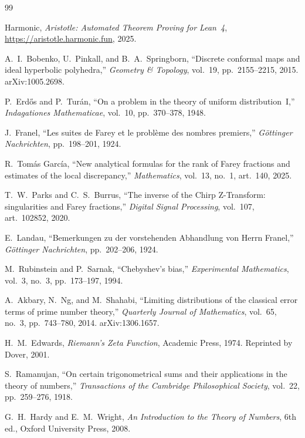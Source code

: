 \documentclass[11pt]{article}
\theoremstyle{definition}
\begin{document}
\begin{thebibliography}{99}

Harmonic,
\emph{Aristotle: Automated Theorem Proving for Lean~4},
\url{https://aristotle.harmonic.fun}, 2025.

A.~I.~Bobenko, U.~Pinkall, and B.~A.~Springborn,
``Discrete conformal maps and ideal hyperbolic polyhedra,''
\emph{Geometry \& Topology}, vol.~19, pp.~2155--2215, 2015.
arXiv:1005.2698.

P.~Erd\H{o}s and P.~Tur\'an,
``On a problem in the theory of uniform distribution~I,''
\emph{Indagationes Mathematicae}, vol.~10, pp.~370--378, 1948.

J.~Franel,
``Les suites de Farey et le probl\`eme des nombres premiers,''
\emph{G\"ottinger Nachrichten}, pp.~198--201, 1924.

R.~Tom\'as Garc\'ia,
``New analytical formulas for the rank of Farey fractions
and estimates of the local discrepancy,''
\emph{Mathematics}, vol.~13, no.~1, art.~140, 2025.

T.~W.~Parks and C.~S.~Burrus,
``The inverse of the Chirp Z-Transform: singularities and
Farey fractions,''
\emph{Digital Signal Processing}, vol.~107, art.~102852, 2020.

E.~Landau,
``Bemerkungen zu der vorstehenden Abhandlung von Herrn Franel,''
\emph{G\"ottinger Nachrichten}, pp.~202--206, 1924.

M.~Rubinstein and P.~Sarnak,
``Chebyshev's bias,''
\emph{Experimental Mathematics}, vol.~3, no.~3, pp.~173--197, 1994.

A.~Akbary, N.~Ng, and M.~Shahabi,
``Limiting distributions of the classical error terms of prime number theory,''
\emph{Quarterly Journal of Mathematics}, vol.~65, no.~3, pp.~743--780, 2014.
arXiv:1306.1657.


H.~M.~Edwards,
\emph{Riemann's Zeta Function},
Academic Press, 1974.
Reprinted by Dover, 2001.

S.~Ramanujan,
``On certain trigonometrical sums and their applications in the
theory of numbers,''
\emph{Transactions of the Cambridge Philosophical Society},
vol.~22, pp.~259--276, 1918.

G.~H.~Hardy and E.~M.~Wright,
\emph{An Introduction to the Theory of Numbers}, 6th ed.,
Oxford University Press, 2008.


\end{thebibliography}
\end{document}
